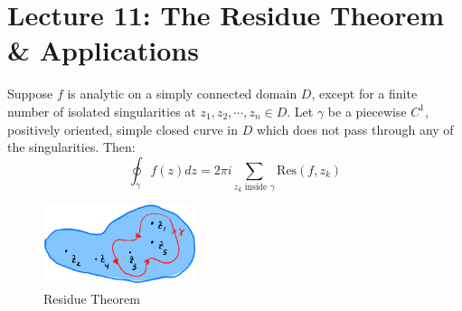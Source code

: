\chapter{Lecture 11: The Residue Theorem \& Applications} %

\begin{theorem}
    Suppose $f$ is analytic on a simply connected domain $D$, except for a finite number of isolated singularities at $z_1, z_2, \cdots, z_n \in D$. Let $\gamma$ be a piecewise $C^1$, positively oriented, simple closed curve in $D$ which does not pass through any of the singularities. Then:
    \begin{equation}
        \boxed{\oint_{\gamma} f(z) dz = 2\pi i \sum_{z_k \text{ inside } \gamma} \text{Res}(f, z_k)}
    \end{equation}
\end{theorem}
\begin{figure}[H]
    \centering
    \includegraphics[width=0.4\textwidth]{LECTURE_11/residues.png}
    \caption{Residue Theorem}
    \label{fig:residue}
\end{figure}

